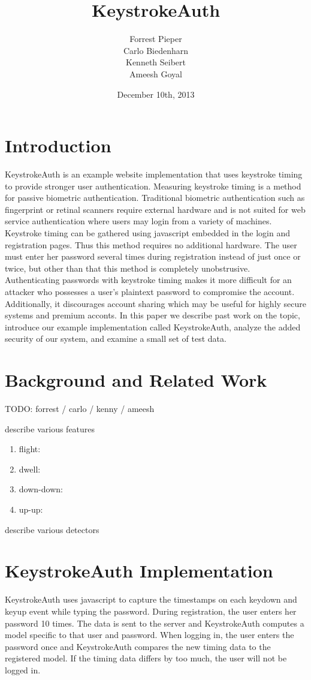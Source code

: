 \documentclass{article}
\title{KeystrokeAuth}
\author{
  Forrest Pieper\\
  Carlo Biedenharn\\
  Kenneth Seibert\\
  Ameesh Goyal
}
\date{December 10th, 2013}
\begin{document}
\maketitle

\abstract{
}

\section{Introduction}
\label{introduction}
KeystrokeAuth is an example website implementation that uses keystroke timing to provide stronger user authentication.
Measuring keystroke timing is a method for passive biometric authentication. 
Traditional biometric authentication such as fingerprint or retinal scanners require external hardware and is not suited for web service authentication where users may login from a variety of machines. 
Keystroke timing can be gathered using javascript embedded in the login and registration pages.
Thus this method requires no additional hardware.
The user must enter her password several times during registration instead of just once or twice, but other than that this method is completely unobstrusive.
Authenticating passwords with keystroke timing makes it more difficult for an attacker who possesses a user's plaintext password to compromise the account.
Additionally, it discourages account sharing which may be useful for highly secure systems and premium acconts.
In this paper we describe past work on the topic, introduce our example implementation called KeystrokeAuth, analyze the added security of our system, and examine a small set of test data.

\section{Background and Related Work}
TODO: forrest / carlo / kenny / ameesh

describe various features
\begin{enumerate}[-]
  \item flight:
  \item dwell:
  \item down-down:
  \item up-up:
\end{enumerate}

describe various detectors

\section{KeystrokeAuth Implementation}
KeystrokeAuth uses javascript to capture the timestamps on each keydown and keyup event while typing the password.
During registration, the user enters her password 10 times.
The data is sent to the server and KeystrokeAuth computes a model specific to that user and password.
When logging in, the user enters the password once and KeystrokeAuth compares the new timing data to the registered model.
If the timing data differs by too much, the user will not be logged in.
\end{document}
